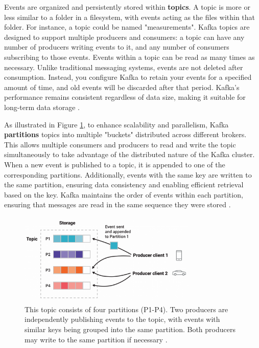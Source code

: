 Events are organized and persistently stored within \textbf{topics}. A topic is more or less similar to a folder in a filesystem, with events acting as the files within that folder. For instance, a topic could be named "measurements". Kafka topics are designed to support multiple producers and consumers: a topic can have any number of producers writing events to it, and any number of consumers subscribing to those events. Events within a topic can be read as many times as necessary. Unlike traditional messaging systems, events are not deleted after consumption. Instead, you configure Kafka to retain your events for a specified amount of time, and old events will be discarded after that period. Kafka's performance remains consistent regardless of data size, making it suitable for long-term data storage \cite{kafkaDoc}.

As illustrated in Figure \ref{fig:partitions}, to enhance scalability and parallelism, Kafka \textbf{partitions} topics into multiple "buckets" distributed across different brokers. This allows multiple consumers and producers to read and write the topic simultaneously to take advantage of the distributed nature of the Kafka cluster. When a new event is published to a topic, it is appended to one of the corresponding partitions. Additionally, events with the same key are written to the same partition, ensuring data consistency and enabling efficient retrieval based on the key. Kafka maintains the order of events within each partition, ensuring that messages are read in the same sequence they were stored \cite{kafkaDoc}.

\begin{figure}[ht]
    \centering
    \includegraphics[width=8.5cm]{images/partitions.png}
    \caption{This topic consists of four partitions (P1-P4). Two producers are independently publishing events to the topic, with events with similar keys being grouped into the same partition. Both producers may write to the same partition if necessary \cite{kafkaDoc}.}
    \label{fig:partitions}
\end{figure}

